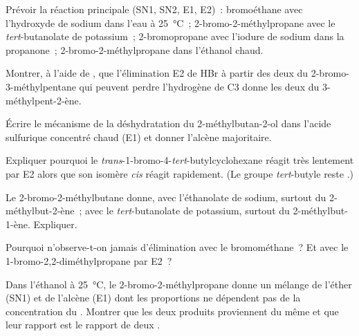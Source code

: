 \begin{exercise}[$\star$]\label{exo:b1:elimination:4}
Prévoir la réaction principale (SN1, SN2, E1, E2)~: bromoéthane avec
l'hydroxyde de sodium dans l'eau à \qty{25}{\celsius}~;
2-bromo-2-méthylpropane avec le \textit{tert}-butanolate de potassium~;
2-bromopropane avec l'iodure de sodium dans la propanone~;
2-bromo-2-méthylpropane dans l'éthanol chaud.
\end{exercise}

\begin{exercise}[$\star\star$]\label{exo:b1:elimination:5}
Montrer, à l'aide de , que l'élimination E2 de HBr
à partir des deux  du 2-bromo-3-méthylpentane qui
peuvent perdre l'hydrogène de C3 donne les deux  du
3-méthylpent-2-ène.
\end{exercise}

\begin{exercise}[$\star\star$]\label{exo:b1:elimination:6}
Écrire le mécanisme de la déshydratation du 2-méthylbutan-2-ol dans
l'acide sulfurique concentré chaud (E1) et donner l'alcène majoritaire.
\end{exercise}

\begin{exercise}[$\star\star$]\label{exo:b1:elimination:7}
Expliquer pourquoi le \textit{trans}-1-bromo-4-\textit{tert}-butylcyclohexane
réagit très lentement par E2 alors que son isomère \textit{cis} réagit
rapidement. (Le groupe \textit{tert}-butyle reste .)
\end{exercise}

\begin{exercise}[$\star\star$]\label{exo:b1:elimination:8}
Le 2-bromo-2-méthylbutane donne, avec l'éthanolate de sodium,
surtout du 2-méthylbut-2-ène~; avec le \textit{tert}-butanolate de
potassium, surtout du 2-méthylbut-1-ène. Expliquer.
\end{exercise}

\begin{exercise}[$\star\star$]\label{exo:b1:elimination:9}
Pourquoi n'observe-t-on jamais d'élimination avec le bromométhane~? Et
avec le 1-bromo-2,2-diméthylpropane par E2~?
\end{exercise}

\begin{exercise}[$\star\star\star$]\label{exo:b1:elimination:10}
Dans l'éthanol à \qty{25}{\celsius}, le 2-bromo-2-méthylpropane donne un
mélange de l'éther (SN1) et de l'alcène (E1) dont les proportions ne
dépendent pas de la concentration du . Montrer que les deux
produits proviennent du même  et que leur rapport est le
rapport de deux .
\end{exercise}

